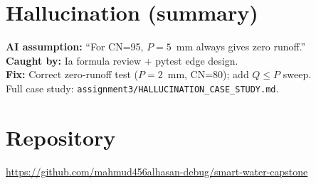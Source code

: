 \documentclass[11pt,a4paper]{article}
\begin{document}
\section{Hallucination (summary)}
\textbf{AI assumption:} ``For CN=95, $P=5$~mm always gives zero runoff.''\\
\textbf{Caught by:} Ia formula review + pytest edge design.\\
\textbf{Fix:} Correct zero-runoff test ($P=2$~mm, CN=80); add $Q \le P$ sweep.\\
Full case study: \texttt{assignment3/HALLUCINATION\_CASE\_STUDY.md}.

\section{Repository}
\url{https://github.com/mahmud456alhasan-debug/smart-water-capstone}
\end{document}
